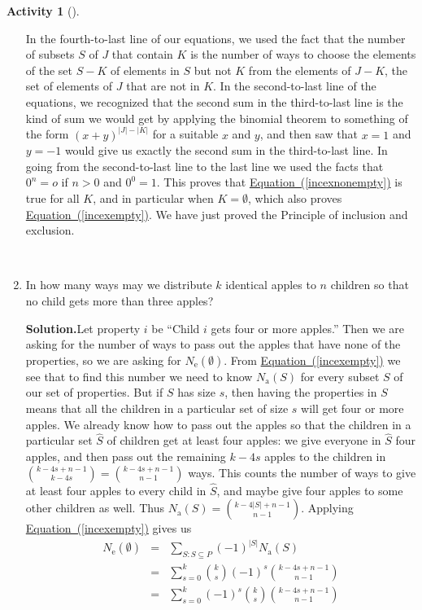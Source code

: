 \documentclass[10pt,]{book}
\theoremstyle{plain}
\theoremstyle{definition}
\newtheorem{activity}[project]{Activity}
\numberwithin{equation}{chapter}
\newcommand{\amp}{&}
\begin{document}
\begin{activity}[]
\begin{enumerate}[label=(\alph*)]
%
\par
In the fourth-to-last line of our equations, we used the fact that the number of subsets \(S\) of \(J\) that contain \(K\) is the number of ways to choose the elements of the set \(S-K\) of elements in \(S\) but not \(K\) from the elements of \(J-K\), the set of elements of \(J\) that are not in \(K\). In the second-to-last line of the equations, we recognized that the second sum in the third-to-last line is the kind of sum we would get by applying the binomial theorem to something of the form \((x+y)^{|J|-|K|}\) for a suitable \(x\) and \(y\), and then saw that \(x=1\) and \(y=-1\) would give us exactly the second sum in the third-to-last line. In going from the second-to-last line to the last line we used the facts that \(0^n=o\) if \(n>0\) and \(0^0=1\). This proves that \hyperref[incexnonempty]{Equation~(\ref{incexnonempty})} is true for all \(K\), and in particular when \(K=\emptyset\), which also proves \hyperref[incexempty]{Equation~(\ref{incexempty})}. We have just proved the Principle of inclusion and exclusion.%

~\par
\item In how many ways may we distribute \(k\) identical apples to \(n\) children so that no child gets more than three apples?%
\par\medskip\noindent%
\textbf{Solution.}\quad Let property \(i\) be ``Child \(i\) gets four or more apples.'' Then we are asking for the number of ways to pass out the apples that have none of the properties, so we are asking for \(N_{\mbox{e} }(\emptyset)\). From \hyperref[incexempty]{Equation~(\ref{incexempty})} we see that to find this number we need to know \(N_{\mbox{a} }(S)\) for every subset \(S\) of our set of properties. But if \(S\) has size \(s\), then having the properties in \(S\) means that all the children in a particular set of size \(s\) will get four or more apples. We already know how to pass out the apples so that the children in a particular set \(\hat S\) of children get at least four apples: we give everyone in \(\hat
S\) four apples, and then pass out the remaining \(k-4s\) apples to the children in \(\binom{k-4s+n-1}{k-4s}= \binom{k-4s+n-1}{n-1}\) ways. This counts the number of ways to give at least four apples to every child in \(\hat S\), and maybe give four apples to some other children as well. Thus \(N_{\mbox{a} }(S) = \binom{k-4|S|+n-1}{n-1}\). Applying \hyperref[incexempty]{Equation~(\ref{incexempty})} gives us%
\begin{align*}
N_{\mbox{e} }(\emptyset)\amp =\amp \sum_{S:S\subseteq
P}(-1)^{|S|}N_{\mbox{a} }(S)\\
\amp =\amp \sum_{s=0}^k \binom{k}{s}(-1)^s \binom{k-4s+n-1}{n-1}\\
\amp =\amp \sum_{s=0}^k (-1)^s\binom{k}{s}\binom{k-4s+n-1}{n-1}
\end{align*}
%

\end{enumerate}
\end{activity}
\end{document}
